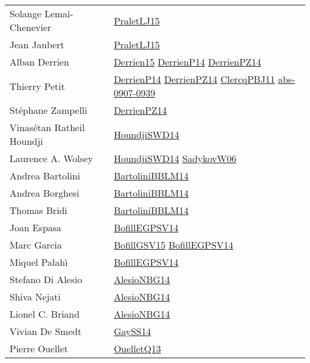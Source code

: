 {\begin{longtable}{p{4cm}p{15cm}}
Solange Lemai{-}Chenevier & \href{papers/PraletLJ15.pdf}{PraletLJ15}\cite{PraletLJ15} \\
Jean Jaubert & \href{papers/PraletLJ15.pdf}{PraletLJ15}\cite{PraletLJ15} \\
Alban Derrien & \href{}{Derrien15}\cite{Derrien15} \href{papers/DerrienP14.pdf}{DerrienP14}\cite{DerrienP14} \href{papers/DerrienPZ14.pdf}{DerrienPZ14}\cite{DerrienPZ14} \\
Thierry Petit & \href{papers/DerrienP14.pdf}{DerrienP14}\cite{DerrienP14} \href{papers/DerrienPZ14.pdf}{DerrienPZ14}\cite{DerrienPZ14} \href{papers/ClercqPBJ11.pdf}{ClercqPBJ11}\cite{ClercqPBJ11} \href{articles/abs-0907-0939.pdf}{abs-0907-0939}\cite{abs-0907-0939} \\
St{\'{e}}phane Zampelli & \href{papers/DerrienPZ14.pdf}{DerrienPZ14}\cite{DerrienPZ14} \\
Vinas{\'{e}}tan Ratheil Houndji & \href{papers/HoundjiSWD14.pdf}{HoundjiSWD14}\cite{HoundjiSWD14} \\
Laurence A. Wolsey & \href{papers/HoundjiSWD14.pdf}{HoundjiSWD14}\cite{HoundjiSWD14} \href{articles/SadykovW06.pdf}{SadykovW06}\cite{SadykovW06} \\
Andrea Bartolini & \href{papers/BartoliniBBLM14.pdf}{BartoliniBBLM14}\cite{BartoliniBBLM14} \\
Andrea Borghesi & \href{papers/BartoliniBBLM14.pdf}{BartoliniBBLM14}\cite{BartoliniBBLM14} \\
Thomas Bridi & \href{papers/BartoliniBBLM14.pdf}{BartoliniBBLM14}\cite{BartoliniBBLM14} \\
Joan Espasa & \href{papers/BofillEGPSV14.pdf}{BofillEGPSV14}\cite{BofillEGPSV14} \\
Marc Garcia & \href{papers/BofillGSV15.pdf}{BofillGSV15}\cite{BofillGSV15} \href{papers/BofillEGPSV14.pdf}{BofillEGPSV14}\cite{BofillEGPSV14} \\
Miquel Palah{\'{\i}} & \href{papers/BofillEGPSV14.pdf}{BofillEGPSV14}\cite{BofillEGPSV14} \\
Stefano {Di Alesio} & \href{papers/AlesioNBG14.pdf}{AlesioNBG14}\cite{AlesioNBG14} \\
Shiva Nejati & \href{papers/AlesioNBG14.pdf}{AlesioNBG14}\cite{AlesioNBG14} \\
Lionel C. Briand & \href{papers/AlesioNBG14.pdf}{AlesioNBG14}\cite{AlesioNBG14} \\
Vivian De Smedt & \href{papers/GaySS14.pdf}{GaySS14}\cite{GaySS14} \\
Pierre Ouellet & \href{papers/OuelletQ13.pdf}{OuelletQ13}\cite{OuelletQ13} \\

\end{longtable}}

